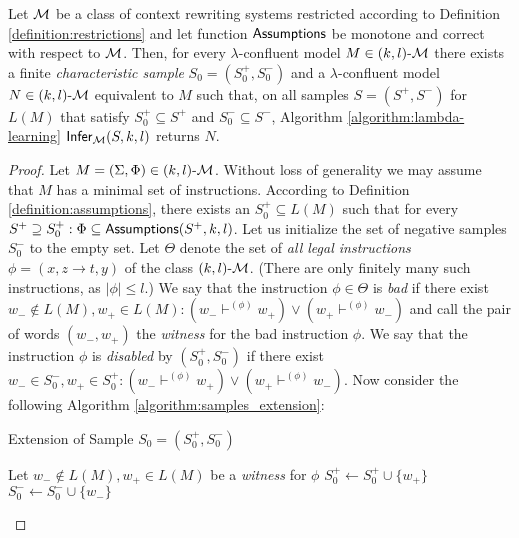 \begin{theorem}\label{theorem:lambda-inference}
Let $\textup{\sf $\mathcal{M}$}$ be a class of context rewriting systems restricted according to Definition \ref{definition:restrictions} and let function $\textup{\sf Assumptions}$ be monotone and correct with respect to $\textup{\sf $\mathcal{M}$}$. Then, for every $\lambda$-confluent model $M \in \textup{\sf $(k,l)$-\textup{\sf $\mathcal{M}$}}$ there exists a finite \emph{characteristic sample} $S_0 = (S_0^+, S_0^-)$ and a $\lambda$-confluent model $N \in \textup{\sf $(k,l)$-\textup{\sf $\mathcal{M}$}}$ equivalent to $M$ such that, on all samples $S = (S^+, S^-)$ for $L(M)$ that satisfy $S_0^+ \subseteq S^+$ and $S_0^- \subseteq S^-$, Algorithm \ref{algorithm:lambda-learning} $\textup{\sf Infer}_{\textup{\sf $\mathcal{M}$}}(S, k, l)$ returns $N$.
\end{theorem}

\begin{proof}
Let $M = (\Sigma, \Phi) \in \textup{\sf $(k,l)$-\textup{\sf $\mathcal{M}$}}$. Without loss of generality we may assume that $M$ has a minimal set of instructions. According to Definition \ref{definition:assumptions}, there exists an $S_0^+ \subseteq L(M)$ such that for every $S^+ \supseteq S_0^+: \Phi \subseteq \textup{\sf Assumptions}(S^+, k, l)$. Let us initialize the set of negative samples $S_0^-$ to the empty set. Let $\Theta$ denote the set of \emph{all legal instructions} $\phi = (x, z \to t, y)$ of the class $\textup{\sf $(k,l)$-\textup{\sf $\mathcal{M}$}}$. (There are only finitely many such instructions, as $|\phi| \le l$.) We say that the instruction $\phi \in \Theta$ is \emph{bad} if there exist $w_- \notin L(M), w_+ \in L(M): (w_- \vdash^{(\phi)} w_+) \vee (w_+ \vdash^{(\phi)} w_-)$ and call the pair of words $(w_-, w_+)$ the \emph{witness} for the bad instruction $\phi$. We say that the instruction $\phi$ is \emph{disabled} by $(S_0^+, S_0^-)$ if there exist $w_- \in S_0^-, w_+ \in S_0^+: (w_- \vdash^{(\phi)} w_+) \vee (w_+ \vdash^{(\phi)} w_-)$. Now consider the following Algorithm \ref{algorithm:samples_extension}:

\begin{algorithm}\label{algorithm:extend}
\caption{Extension of Sample $S_0 = (S_0^+, S_0^-)$}
\label{algorithm:samples_extension}
\LinesNumbered
{}
{
Let $w_- \notin L(M), w_+ \in L(M)$ be a \emph{witness} for $\phi$\;
$S_0^+ \leftarrow S_0^+ \cup \{ w_+ \}$\;
$S_0^- \leftarrow S_0^- \cup \{ w_- \}$\;
}
\end{algorithm}


\end{proof}
